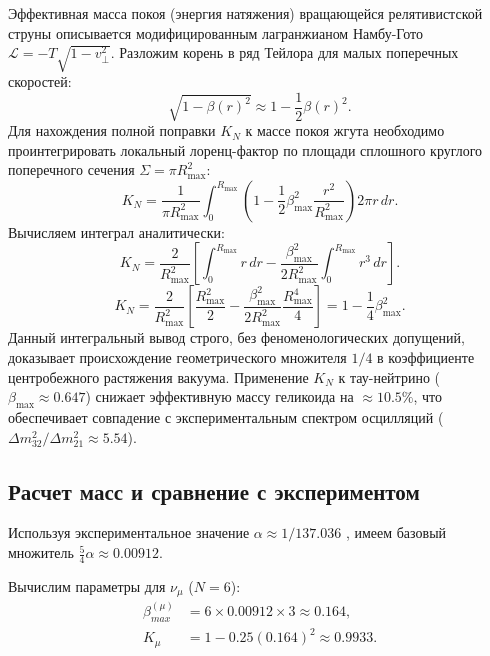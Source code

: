 \documentclass[11pt,a4paper]{article}
\begin{document}
Эффективная масса покоя (энергия натяжения) вращающейся релятивистской струны описывается модифицированным лагранжианом Намбу-Гото $\mathcal{L} = -T \sqrt{1 - v_\perp^2}$. Разложим корень в ряд Тейлора для малых поперечных скоростей:
\begin{equation}
\sqrt{1 - \beta(r)^2} \approx 1 - \frac{1}{2} \beta(r)^2.
\end{equation}
Для нахождения полной поправки $K_N$ к массе покоя жгута необходимо проинтегрировать локальный лоренц-фактор по площади сплошного круглого поперечного сечения $\Sigma = \pi R_{\text{max}}^2$:
\begin{equation}
K_N = \frac{1}{\pi R_{\text{max}}^2} \int_0^{R_{\text{max}}} \left( 1 - \frac{1}{2} \beta_{\text{max}}^2 \frac{r^2}{R_{\text{max}}^2} \right) 2\pi r \, dr.
\end{equation}
Вычисляем интеграл аналитически:
\begin{equation}
K_N = \frac{2}{R_{\text{max}}^2} \left[ \int_0^{R_{\text{max}}} r \, dr - \frac{\beta_{\text{max}}^2}{2 R_{\text{max}}^2} \int_0^{R_{\text{max}}} r^3 \, dr \right].
\end{equation}
\begin{equation}
K_N = \frac{2}{R_{\text{max}}^2} \left[ \frac{R_{\text{max}}^2}{2} - \frac{\beta_{\text{max}}^2}{2 R_{\text{max}}^2} \frac{R_{\text{max}}^4}{4} \right] = 1 - \frac{1}{4} \beta_{\text{max}}^2.
\label{eq:k_factor}
\end{equation}
Данный интегральный вывод строго, без феноменологических допущений, доказывает происхождение геометрического множителя $1/4$ в коэффициенте центробежного растяжения вакуума. Применение $K_N$ к тау-нейтрино ($\beta_{\text{max}} \approx 0.647$) снижает эффективную массу геликоида на $\approx 10.5\%$, что обеспечивает совпадение с экспериментальным спектром осцилляций ($\Delta m^2_{32} / \Delta m^2_{21} \approx 5.54$).

\subsection{Расчет масс и сравнение с экспериментом}
	
	Используя экспериментальное значение $\alpha \approx 1/137.036$ \cite{codata2018}, имеем базовый множитель $\frac{5}{4}\alpha \approx 0.00912$. 
	
	Вычислим параметры для $\nu_\mu$ ($N=6$):
	\begin{align}
		\beta_{max}^{(\mu)} &= 6 \times 0.00912 \times 3 \approx 0.164, \\
		K_\mu &= 1 - 0.25 (0.164)^2 \approx 0.9933.
	\end{align}
	
\end{document}
